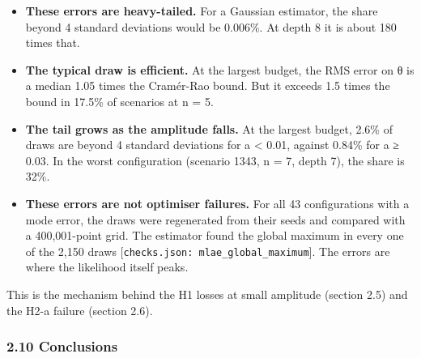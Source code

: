 \documentclass[
  10pt,
]{article}
\providecommand{\tightlist}{%
  \setlength{\itemsep}{0pt}\setlength{\parskip}{0pt}}
\begin{document}
\begin{itemize}
\tightlist
\item
  \textbf{These errors are heavy-tailed.} For a Gaussian estimator, the
  share beyond 4 standard deviations would be 0.006\%. At depth 8 it is
  about 180 times that.
\item
  \textbf{The typical draw is efficient.} At the largest budget, the RMS
  error on θ is a median 1.05 times the Cramér-Rao bound. But it exceeds
  1.5 times the bound in 17.5\% of scenarios at n = 5.
\item
  \textbf{The tail grows as the amplitude falls.} At the largest budget,
  2.6\% of draws are beyond 4 standard deviations for a \textless{}
  0.01, against 0.84\% for a ≥ 0.03. In the worst configuration
  (scenario 1343, n = 7, depth 7), the share is 32\%.
\item
  \textbf{These errors are not optimiser failures.} For all 43
  configurations with a mode error, the draws were regenerated from
  their seeds and compared with a 400,001-point grid. The estimator
  found the global maximum in every one of the 2,150 draws
  {[}\texttt{checks.json:\ mlae\_global\_maximum}{]}. The errors are
  where the likelihood itself peaks.
\end{itemize}

This is the mechanism behind the H1 losses at small amplitude (section
2.5) and the H2-a failure (section 2.6).

\hypertarget{210-conclusions}{%
\subsubsection{2.10 Conclusions}\label{210-conclusions}}
\end{document}
